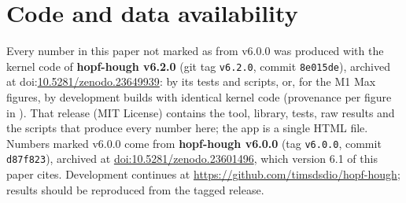 \documentclass[11pt, a4paper]{article}
\begin{document}
\section{Code and data availability}
Every number in this paper not marked as from v6.0.0 was produced with the kernel code of \textbf{hopf-hough v6.2.0} (git tag \texttt{v6.2.0}, commit \texttt{8e015de}), archived at doi:\href{https://doi.org/10.5281/zenodo.23649939}{10.5281/zenodo.23649939}: by its tests and scripts, or, for the M1 Max figures, by development builds with identical kernel code (provenance per figure in ). That release (MIT License) contains the tool, library, tests, raw results and the scripts that produce every number here; the app is a single HTML file. Numbers marked v6.0.0 come from \textbf{hopf-hough v6.0.0} (tag \texttt{v6.0.0}, commit \texttt{d87f823}), archived at \href{https://doi.org/10.5281/zenodo.23601496}{doi:10.5281/zenodo.23601496}, which version 6.1 of this paper cites. Development continues at \url{https://github.com/timsdsdio/hopf-hough}; results should be reproduced from the tagged release.
\end{document}
